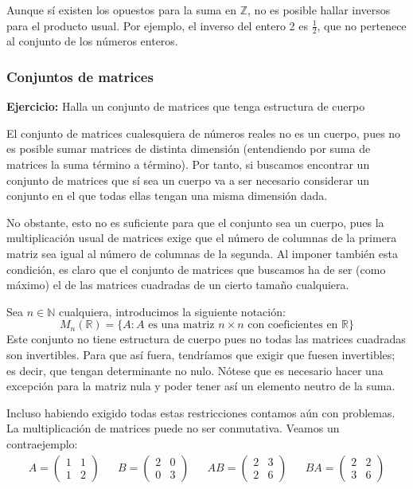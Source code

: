 \documentclass[12pt]{article}
\begin{document}
\vspace{2mm}
Aunque sí existen los opuestos para la suma en $\mathbb{Z}$, no 
es posible hallar inversos para el producto usual. Por ejemplo, el inverso
del entero 2 es $\frac{1}{2}$, que no pertenece al conjunto de los números enteros.

\subsubsection{Conjuntos de matrices}
\textbf{Ejercicio:} Halla un conjunto de matrices que tenga estructura de cuerpo

\vspace{2mm} \hspace{3mm}
El conjunto de matrices cualesquiera de números reales no es un cuerpo, pues no es posible
sumar matrices de distinta dimensión (entendiendo por suma de matrices la suma término a término).
Por tanto, si buscamos encontrar un conjunto de matrices que sí sea un cuerpo va a ser necesario
considerar un conjunto en el que todas ellas tengan una misma dimensión dada.

\vspace{2mm}
No obstante, esto no es suficiente para que el conjunto sea un cuerpo, pues la multiplicación usual de matrices
exige que el número de columnas de la primera matriz sea igual al número de columnas de la segunda. Al imponer también esta condición,
es claro que el conjunto de matrices que buscamos ha de ser (como máximo) el de las matrices cuadradas de un cierto tamaño cualquiera.

\vspace{2mm}
Sea $n \in \mathbb{N}$ cualquiera, introducimos la siguiente notación:
$$M_n(\mathbb{R}) = \{A : A\text{ es una matriz } n \times n \text{ con coeficientes en } \mathbb{R}\}$$
Este conjunto no tiene estructura de cuerpo pues no todas las matrices cuadradas son invertibles. Para que así fuera,
tendríamos que exigir que fuesen invertibles; es decir, que tengan determinante no nulo. Nótese que
es necesario hacer una excepción para la matriz nula y poder tener así un elemento neutro de la suma.

\vspace{2mm}
Incluso habiendo exigido todas estas restricciones contamos aún con problemas. La multiplicación de matrices puede
no ser conmutativa. Veamos un contraejemplo:
\begin{align*}
    A =
    \begin{pmatrix}
        1 & 1\\
        1 & 2
    \end{pmatrix} &&
    B = 
    \begin{pmatrix}
        2 & 0\\
        0 & 3
    \end{pmatrix}&&
    AB = 
    \begin{pmatrix}
        2 & 3\\
        2 & 6
    \end{pmatrix} &&
    BA = 
    \begin{pmatrix}
        2 & 2\\
        3 & 6
    \end{pmatrix}
\end{align*}
\end{document}

